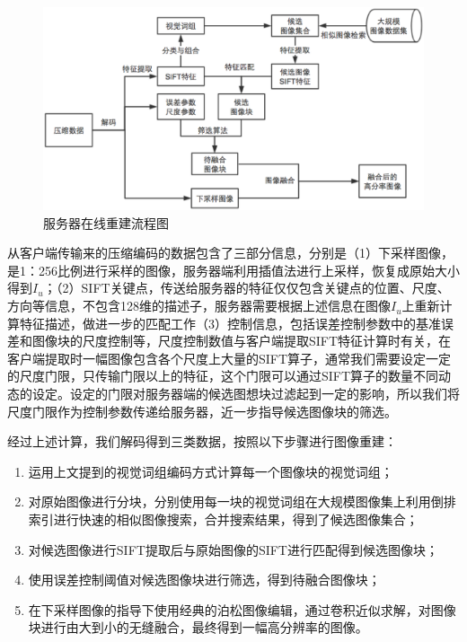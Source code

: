 \begin{figure}
\centering\includegraphics[width=15cm]{imgs/ch4/serverOnline}
\caption{服务器在线重建流程图}
\label{fig:serverOnline}
\end{figure}

从客户端传输来的压缩编码的数据包含了三部分信息，分别是（1）下采样图像，是1：256比例进行采样的图像，服务器端利用插值法进行上采样，恢复成原始大小得到\(I_u\)；（2）SIFT关键点，传送给服务器的特征仅仅包含关键点的位置、尺度、方向等信息，不包含128维的描述子，服务器需要根据上述信息在图像\(I_u\)上重新计算特征描述，做进一步的匹配工作（3）控制信息，包括误差控制参数中的基准误差和图像块的尺度控制等，尺度控制数值与客户端提取SIFT特征计算时有关，在客户端提取时一幅图像包含各个尺度上大量的SIFT算子，通常我们需要设定一定的尺度门限，只传输门限以上的特征，这个门限可以通过SIFT算子的数量不同动态的设定。设定的门限对服务器端的候选图想块过滤起到一定的影响，所以我们将尺度门限作为控制参数传递给服务器，近一步指导候选图像块的筛选。

经过上述计算，我们解码得到三类数据，按照以下步骤进行图像重建：

\begin{enumerate}
\item 运用上文提到的视觉词组编码方式计算每一个图像块的视觉词组；
\item 对原始图像进行分块，分别使用每一块的视觉词组在大规模图像集上利用倒排索引进行快速的相似图像搜索，合并搜索结果，得到了候选图像集合；
\item 对候选图像进行SIFT提取后与原始图像的SIFT进行匹配得到候选图像块；
\item 使用误差控制阈值对候选图像块进行筛选，得到待融合图像块；
\item 在下采样图像的指导下使用经典的泊松图像编辑\cite{Perez:2003ul}，通过卷积近似求解\cite{Farbman:2011dc}，对图像块进行由大到小的无缝融合，最终得到一幅高分辨率的图像。
\end{enumerate}

